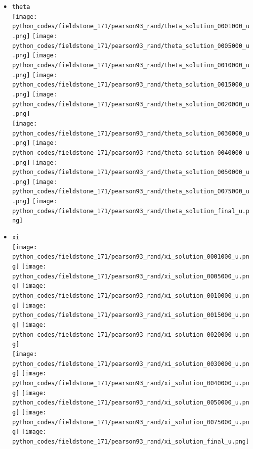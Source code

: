 \begin{itemize}
\item {\tt theta}\\
\texttt{[image: python\_codes/fieldstone\_171/pearson93\_rand/theta\_solution\_0001000\_u.png]}
\texttt{[image: python\_codes/fieldstone\_171/pearson93\_rand/theta\_solution\_0005000\_u.png]}
\texttt{[image: python\_codes/fieldstone\_171/pearson93\_rand/theta\_solution\_0010000\_u.png]}
\texttt{[image: python\_codes/fieldstone\_171/pearson93\_rand/theta\_solution\_0015000\_u.png]}
\texttt{[image: python\_codes/fieldstone\_171/pearson93\_rand/theta\_solution\_0020000\_u.png]}\\
\texttt{[image: python\_codes/fieldstone\_171/pearson93\_rand/theta\_solution\_0030000\_u.png]}
\texttt{[image: python\_codes/fieldstone\_171/pearson93\_rand/theta\_solution\_0040000\_u.png]}
\texttt{[image: python\_codes/fieldstone\_171/pearson93\_rand/theta\_solution\_0050000\_u.png]}
\texttt{[image: python\_codes/fieldstone\_171/pearson93\_rand/theta\_solution\_0075000\_u.png]}
\texttt{[image: python\_codes/fieldstone\_171/pearson93\_rand/theta\_solution\_final\_u.png]}

\item {\tt xi}\\
\texttt{[image: python\_codes/fieldstone\_171/pearson93\_rand/xi\_solution\_0001000\_u.png]}
\texttt{[image: python\_codes/fieldstone\_171/pearson93\_rand/xi\_solution\_0005000\_u.png]}
\texttt{[image: python\_codes/fieldstone\_171/pearson93\_rand/xi\_solution\_0010000\_u.png]}
\texttt{[image: python\_codes/fieldstone\_171/pearson93\_rand/xi\_solution\_0015000\_u.png]}
\texttt{[image: python\_codes/fieldstone\_171/pearson93\_rand/xi\_solution\_0020000\_u.png]}\\
\texttt{[image: python\_codes/fieldstone\_171/pearson93\_rand/xi\_solution\_0030000\_u.png]}
\texttt{[image: python\_codes/fieldstone\_171/pearson93\_rand/xi\_solution\_0040000\_u.png]}
\texttt{[image: python\_codes/fieldstone\_171/pearson93\_rand/xi\_solution\_0050000\_u.png]}
\texttt{[image: python\_codes/fieldstone\_171/pearson93\_rand/xi\_solution\_0075000\_u.png]}
\texttt{[image: python\_codes/fieldstone\_171/pearson93\_rand/xi\_solution\_final\_u.png]}


\end{itemize}
